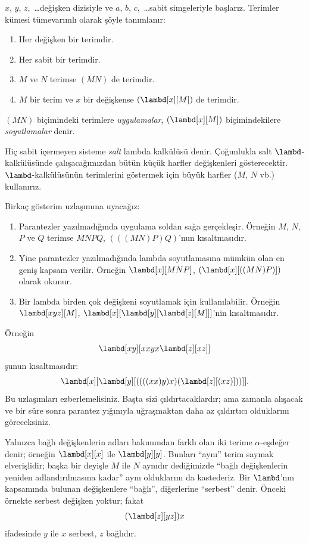 


$x$, $y$, $z$,~\dots değişken dizisiyle ve $a$, $b$, $c$,~\dots sabit
simgeleriyle başlarız. Terimler kümesi tümevarımlı olarak şöyle tanımlanır:
\begin{enumerate}
\item Her değişken bir terimdir.
\item Her sabit bir terimdir.
\item $M$ ve $N$ terimse $(MN)$ de terimdir.
\item $M$ bir terim ve $x$ bir değişkense $(\lambd[x][M])$ de terimdir.
\end{enumerate}
$(MN)$ biçimindeki terimlere \emph{uygulamalar}, $(\lambd[x][M])$
biçimindekilere \emph{soyutlamalar} denir.

Hiç sabit içermeyen sisteme \emph{salt} lambda kalkülüsü denir. Çoğunlukla
salt $\lambd$-kalkülüsünde çalışacağımızdan bütün küçük harfler değişkenleri
gösterecektir. $\lambd$-kalkülüsünün terimlerini göstermek için büyük harfler
($M$, $N$ vb.) kullanırız.

Birkaç gösterim uzlaşımına uyacağız:

\begin{conv}
\begin{enumerate}
\item Parantezler yazılmadığında uygulama soldan sağa gerçekleşir. Örneğin
  $M$, $N$, $P$ ve $Q$ terimse $MNPQ$, $(((MN)P)Q)$'nun kısaltmasıdır.
\item Yine parantezler yazılmadığında lambda soyutlamasına mümkün olan en
  geniş kapsam verilir. Örneğin $\lambd[x][MNP]$,
  $(\lambd[x][((MN)P)])$ olarak okunur.
\item Bir lambda birden çok değişkeni soyutlamak için kullanılabilir.
  Örneğin $\lambd[xyz][M]$,
  $\lambd[x][\lambd[y][\lambd[z][M]]]$'nin kısaltmasıdır.
\end{enumerate}
\end{conv}

Örneğin
\[
\lambd[xy][xxyx \lambd[z][xz]]
\]
şunun kısaltmasıdır:
\[
\lambd[x][\lambd[y][((((xx)y)x)(\lambd[z][(xz)]))]].
\]
Bu uzlaşımları ezberlemelisiniz. Başta sizi çıldırtacaklardır; ama zamanla
alışacak ve bir süre sonra parantez yığınıyla uğraşmaktan daha az
çıldırtıcı olduklarını göreceksiniz.

Yalnızca bağlı değişkenlerin adları bakımından farklı olan iki terime
$\alpha$-eşdeğer denir; örneğin $\lambd[x][x]$ ile $\lambd[y][y]$.
Bunları ``aynı'' terim saymak elverişlidir; başka bir deyişle $M$ ile $N$
aynıdır dediğimizde ``bağlı değişkenlerin yeniden adlandırılmasına kadar''
aynı olduklarını da kastederiz. Bir $\lambd$'nın kapsamında bulunan
değişkenlere ``bağlı'', diğerlerine ``serbest'' denir. Önceki örnekte serbest
değişken yoktur; fakat
\[
(\lambd[z][yz])x
\]
ifadesinde $y$ ile $x$ serbest, $z$ bağlıdır.

